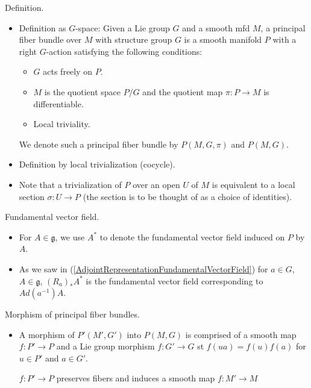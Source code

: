 \documentclass{report}
\theoremstyle{definition}
\begin{document}
Definition.
\begin{itemize}
    \item Definition as $G$-space: Given a Lie group $G$ and a smooth mfd $M$, a principal fiber bundle over $M$ with structure group $G$ is a smooth manifold $P$ with a right $G$-action satisfying the following conditions:
    \begin{itemize}
        \item $G$ acts freely on $P$.
        \item $M$ is the quotient space $P/G$ and the quotient map $\pi:P\to M$ is differentiable.
        \item Local triviality.
    \end{itemize}

    We denote such a principal fiber bundle by $P(M,G,\pi)$ and $P(M,G)$.
    \item Definition by local trivialization (cocycle).
    \item Note that a trivialization of $P$ over an open $U$ of $M$ is equivalent to a local section $\sigma:U\to P$ (the section is to be thought of as a choice of identities).
\end{itemize}

Fundamental vector field.
\begin{itemize}
    \item For $A\in\mathfrak{g}$, we use $A^*$ to denote the fundamental vector field induced on $P$ by $A$.
    \item As we saw in (\ref{AdjointRepresentationFundamentalVectorField}) for $a\in G$, $A\in\mathfrak{g}$, $(R_a)_*A^*$ is the fundamental vector field corresponding to $Ad(a^{-1})A$.
\end{itemize}

Morphism of principal fiber bundles.
\begin{itemize}
    \item A morphism of $P'(M',G')$ into $P(M,G)$ is comprised of a smooth map $f:P'\to P$ and a Lie group morphism $f:G'\to G$ st $f(ua)=f(u)f(a)$ for $u\in P'$ and $a\in G'$.

    $f:P'\to P$ preserves fibers and induces a smooth map $f:M'\to M$
\end{itemize}
\end{document}
